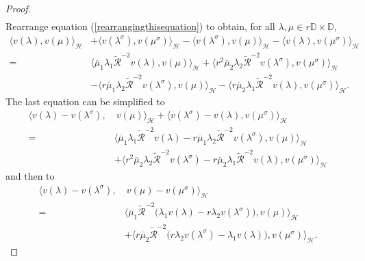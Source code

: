 \documentclass[12pt,reqno]{amsart}
\numberwithin{equation}{section}
\theoremstyle{definition}
\begin{document}
\begin{proof}
\begin{align}
\end{align}
Rearrange equation (\ref{rearrangingthisequation}) to obtain, for all $\lambda,\mu\in r\mathbb{D}\times \mathbb{D}$,
\begin{align*}
\Big\langle v(\lambda), v(\mu) \Big\rangle_{\mathcal{H}} &+ \Big\langle v(\lambda^{\sigma}),v(\mu^{\sigma})\Big\rangle_{\mathcal{H}}
- \Big\langle v(\lambda^{\sigma}), v(\mu)\Big\rangle_{\mathcal{H}} - \Big\langle v(\lambda), v(\mu^{\sigma})\Big\rangle_{\mathcal{H}} \\
=&\Big\langle \overline{\mu}_{1}\lambda_{1} \widetilde{\mathcal{R}}^{-2} v(\lambda), v(\mu)\Big\rangle_{\mathcal{H}} +\Big\langle r^{2}\overline{\mu}_{2}\lambda_{2}\widetilde{\mathcal{R}}^{-2}v(\lambda^{\sigma}), v(\mu^{\sigma}) \Big\rangle_{\mathcal{H}} \\
&- \Big\langle r\overline{\mu}_{1}\lambda_{2}\widetilde{\mathcal{R}}^{-2}v(\lambda^{\sigma}), v(\mu) \Big\rangle_{\mathcal{H}} -\Big\langle r\overline{\mu}_{2}\lambda_{1}\widetilde{\mathcal{R}}^{-2}v(\lambda),v(\mu^{\sigma})\Big\rangle_{\mathcal{H}}.
\end{align*}
The last  equation can be simplified to 
\begin{align*}
\Big\langle v(\lambda) - v(\lambda^{\sigma}), & \ v(\mu)\Big\rangle_{\mathcal{H}} + \Big\langle v(\lambda^{\sigma})-v(\lambda), v(\mu^{\sigma})\Big\rangle_{\mathcal{H}} \\
 =&\Big\langle \overline{\mu}_{1}\lambda_{1} \widetilde{\mathcal{R}}^{-2} v(\lambda)-r\overline{\mu}_{1}\lambda_{2}\widetilde{\mathcal{R}}^{-2}v(\lambda^{\sigma}), v(\mu)\Big\rangle_{\mathcal{H}} \\
&+ \Big\langle r^{2}\overline{\mu}_{2}\lambda_{2}\widetilde{\mathcal{R}}^{-2}v(\lambda^{\sigma}) - r\overline{\mu}_{2}\lambda_{1}\widetilde{\mathcal{R}}^{-2}v(\lambda),v(\mu^{\sigma}) \Big\rangle_{\mathcal{H}} 
\end{align*}
and then to
\begin{align}\label{right-form-1}
\Big\langle v(\lambda) - v(\lambda^{\sigma}), & \ v(\mu)-v(\mu^{\sigma})\Big\rangle_{\mathcal{H}} \nonumber \\
=&\Big\langle \overline{\mu}_{1}\widetilde{\mathcal{R}}^{-2}\big(\lambda_{1} v(\lambda)-r\lambda_{2}v(\lambda^{\sigma})\big), v(\mu)\Big\rangle_{\mathcal{H}} \nonumber \\
&+\Big\langle r\overline{\mu}_{2}\widetilde{\mathcal{R}}^{-2}\big(r\lambda_{2}v(\lambda^{\sigma}) - \lambda_{1}v(\lambda)\big),v(\mu^{\sigma}) \Big\rangle_{\mathcal{H}} .
\end{align}

\end{proof}
\end{document}
